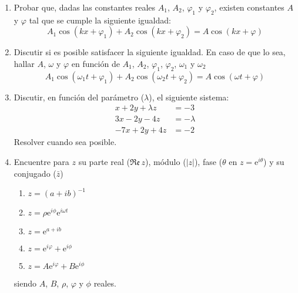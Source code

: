 \documentclass[11pt,spanish,a4paper]{article}
\begin{document}
\begin{enumerate}
\item Probar que, dadas las constantes reales \(A_{1} \), \(A_{2} \), \(\varphi_{1} \) y \(\varphi_{2} \), existen constantes \(A \) y \( \varphi \) tal que se cumple la siguiente igualdad:
\[
A_{1}\cos\left(kx+\varphi_{1}\right)+A_{2}\cos\left(kx+\varphi_{2}\right)=A\cos\left(kx+\varphi\right)
\]

\item Discutir si es posible satisfacer la siguiente igualdad. En caso de que lo sea, hallar \(A \), \(\omega \) y \(\varphi \) en función de \(A_{1} \), \(A_{2} \), \(\varphi_{1} \),  \(\varphi_{2} \), \(\omega_1 \) y \(\omega_2 \)
\[
A_{1}\cos\left(\omega_1 t+\varphi_{1}\right)+A_{2}\cos\left(\omega_2 t+ \varphi_{2}\right)= A\cos\left(\omega t+ \varphi\right)
\]

\item Discutir, en función del parámetro (\(\lambda \)), el siguiente sistema:
\begin{align*}
x+ 2y+ \lambda z & =-3\\
3x- 2y- 4z & = -\lambda\\
-7x+ 2y+ 4z & = -2
\end{align*}
Resolver cuando sea posible.

\item Encuentre para \(z \) su parte real (\( \Re\mathfrak{e}\, z\)), módulo (\( \left| z \right| \)), fase (\( \theta\) en \(z=\mathrm{e}^{i \theta} \)) y su conjugado (\( \bar{z} \))
\begin{enumerate}
	\item \(z=(a+ i b)^{-1} \)
	\item \(z=\rho \mathrm{e}^{i \phi} \mathrm{e}^{i \omega t} \)
	\item \(z= \mathrm{e}^{a+ i b} \)
	\item \(z= \mathrm{e}^{i \varphi}+ \mathrm{e}^{i \phi} \)
	\item \(z= A \mathrm{e}^{i \varphi}+ B \mathrm{e}^{i \phi} \)
\end{enumerate}
siendo \(A \), \(B \), \(\rho \), \(\varphi \) y \(\phi \) reales.

\end{enumerate}
\end{document}
